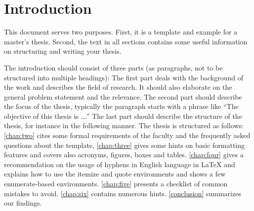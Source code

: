 \chapter{Introduction}
\label{chap:one}

This document serves two purposes. First, it is a template and example for a master's thesis. Second, the text in all sections contains some useful information on structuring and writing your thesis.

The introduction should consist of three parts (as paragraphs, not to be structured into multiple headings): The first part deals with the background of the work and describes the field of research. 
It should also elaborate on the general problem statement and the relevance. 
The second part should describe the focus of the thesis, typically the paragraph starts with a phrase like ``The objective of this thesis is \ldots.'' 
The last part should describe the structure of the thesis, for instance in the following manner. 
The thesis is structured as follows: \autoref{chap:two} cites some formal requirements of the faculty and the frequently asked questions about the template, \autoref{chap:three} gives some hints on basic formatting features and covers also acronyms, figures, boxes and tables. 
\autoref{chap:four} gives a recommendation on the usage of hyphens in English language in \LaTeX{} and explains how to use the itemize and quote environments and shows a few enumerate-based environments. 
\autoref{chap:five} presents a checklist of common mistakes to avoid. 
\autoref{chap:six} contains numerous hints. \autoref{conclusion} summarizes our findings.
